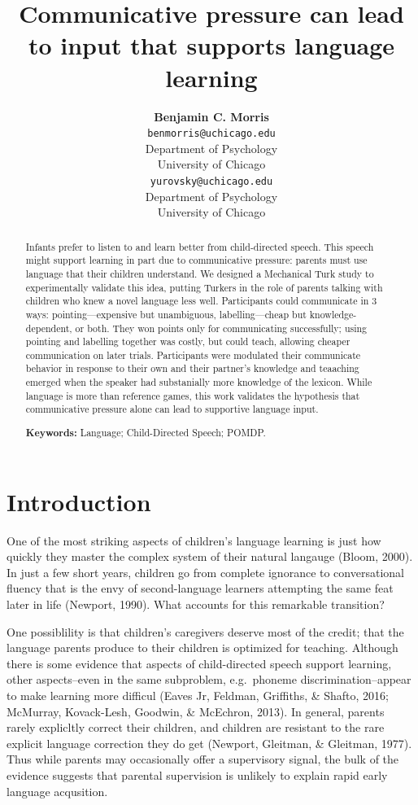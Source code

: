\documentclass[10pt, letterpaper]{article}
\title{Communicative pressure can lead to input that supports language learning}
\author{{\large \bf Benjamin C. Morris} \\ \texttt{benmorris@uchicago.edu} \\ Department of Psychology \\ University of Chicago \And {\large \bf Daniel Yurovsky} \\ \texttt{yurovsky@uchicago.edu} \\ Department of Psychology \\ University of Chicago}
\begin{document}
\maketitle

\begin{abstract}
Infants prefer to listen to and learn better from child-directed speech.
This speech might support learning in part due to communicative
pressure: parents must use language that their children understand. We
designed a Mechanical Turk study to experimentally validate this idea,
putting Turkers in the role of parents talking with children who knew a
novel language less well. Participants could communicate in 3 ways:
pointing---expensive but unambiguous, labelling---cheap but
knowledge-dependent, or both. They won points only for communicating
successfully; using pointing and labelling together was costly, but
could teach, allowing cheaper communication on later trials.
Participants were modulated their communicate behavior in response to
their own and their partner's knowledge and teaaching emerged when the
speaker had substanially more knowledge of the lexicon. While language
is more than reference games, this work validates the hypothesis that
communicative pressure alone can lead to supportive language input.

\textbf{Keywords:}
Language; Child-Directed Speech; POMDP.
\end{abstract}

\section{Introduction}\label{introduction}

One of the most striking aspects of children's language learning is just
how quickly they master the complex system of their natural langauge
(Bloom, 2000). In just a few short years, children go from complete
ignorance to conversational fluency that is the envy of second-language
learners attempting the same feat later in life (Newport, 1990). What
accounts for this remarkable transition?

One possiblility is that children's caregivers deserve most of the
credit; that the language parents produce to their children is optimized
for teaching. Although there is some evidence that aspects of
child-directed speech support learning, other aspects--even in the same
subproblem, e.g.~phoneme discrimination--appear to make learning more
difficul (Eaves Jr, Feldman, Griffiths, \& Shafto, 2016; McMurray,
Kovack-Lesh, Goodwin, \& McEchron, 2013). In general, parents rarely
explicltly correct their children, and children are resistant to the
rare explicit language correction they do get (Newport, Gleitman, \&
Gleitman, 1977). Thus while parents may occasionally offer a supervisory
signal, the bulk of the evidence suggests that parental supervision is
unlikely to explain rapid early language acqusition.
\end{document}
